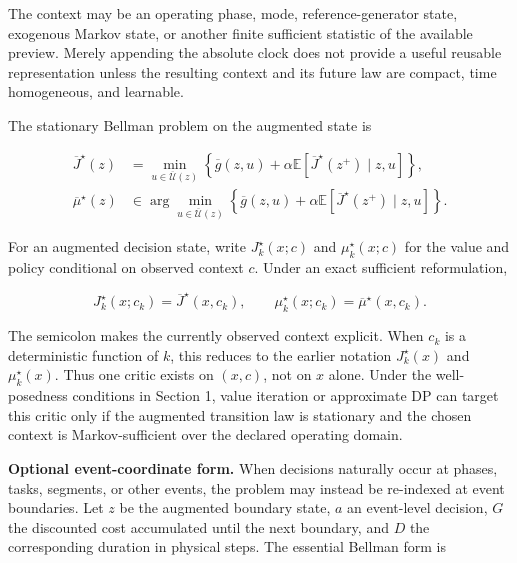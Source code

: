 \documentclass[a4paper]{article}
\begin{document}
The context may be an operating phase, mode, reference-generator state,
exogenous Markov state, or another finite sufficient statistic of the
available preview. Merely appending the absolute clock does not provide a
useful reusable representation unless the resulting context and its future
law are compact, time homogeneous, and learnable.

The stationary Bellman problem on the augmented state is

\begin{equation}
  \begin{aligned}
    \overline J^\star(z)
    &=
    \min_{u\in\overline{\mathcal U}(z)}
    \left\{
    \overline g(z,u)
    +
    \alpha
    \mathbb E
    \!\left[
    \overline J^\star(z^+)\mid z,u
    \right]
    \right\},\\
    \overline\mu^\star(z)
    &\in
    \arg\min_{u\in\overline{\mathcal U}(z)}
    \left\{
    \overline g(z,u)
    +
    \alpha
    \mathbb E
    \!\left[
    \overline J^\star(z^+)\mid z,u
    \right]
    \right\}.
  \end{aligned}
\end{equation}

For an augmented decision state, write $J_k^\star(x;c)$ and
$\mu_k^\star(x;c)$ for the value and policy conditional on observed context
$c$. Under an exact sufficient reformulation,

\begin{equation}
  J_k^\star(x;c_k)
  =
  \overline J^\star(x,c_k),
  \qquad
  \mu_k^\star(x;c_k)
  =
  \overline\mu^\star(x,c_k).
\end{equation}

The semicolon makes the currently observed context explicit. When $c_k$ is a
deterministic function of $k$, this reduces to the earlier notation
$J_k^\star(x)$ and $\mu_k^\star(x)$. Thus one critic exists on $(x,c)$, not on
$x$ alone. Under the well-posedness conditions in Section 1, value iteration
or approximate DP can target this critic only if the augmented transition law
is stationary and the chosen context is Markov-sufficient over the declared
operating domain.

\textbf{Optional event-coordinate form.} When decisions naturally occur at
phases, tasks, segments, or other events, the problem may instead be
re-indexed at event boundaries. Let $z$ be the augmented boundary state, $a$
an event-level decision, $G$ the discounted cost accumulated until the next
boundary, and $D$ the corresponding duration in physical steps. The essential
Bellman form is
\end{document}
